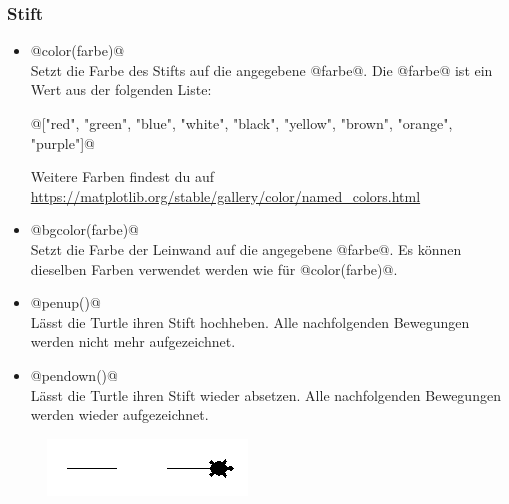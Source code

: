     \subsubsection*{Stift}
    \begin{itemize}
        \item 
        @color(farbe)@\\
        Setzt die Farbe des Stifts auf die angegebene @farbe@. Die @farbe@ ist ein Wert aus der folgenden Liste:
        \begin{center}
            @["red", "green", "blue", "white", "black", "yellow", "brown", "orange", "purple"]@
        \end{center}
        Weitere Farben findest du auf \url{https://matplotlib.org/stable/gallery/color/named_colors.html}
        
        \item 
        @bgcolor(farbe)@\\
        Setzt die Farbe der Leinwand auf die angegebene @farbe@. Es können dieselben Farben verwendet werden wie für @color(farbe)@.
        \item 
        @penup()@\\
        Lässt die Turtle ihren Stift hochheben. Alle nachfolgenden Bewegungen werden nicht mehr aufgezeichnet.
        
        \item 
        @pendown()@\\
        Lässt die Turtle ihren Stift wieder absetzen. Alle nachfolgenden Bewegungen werden wieder aufgezeichnet.
    \end{itemize}
    \begin{figure}[H]
        \centering
        \includegraphics{img/pen}
    \end{figure}

